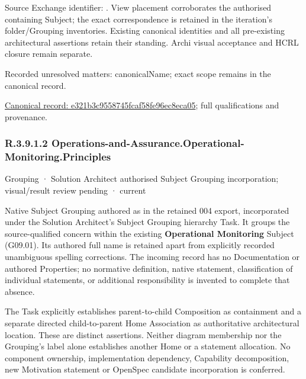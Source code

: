 Source Exchange identifier: \texttt{}. View placement corroborates
the authorised containing Subject; the exact correspondence is retained in the
iteration's folder/Grouping inventories. Existing canonical identities and all
pre-existing architectural assertions retain their standing. Archi visual
acceptance and HCRL closure remain separate.


{\small Recorded unresolved matters: canonicalName; exact scope remains in the canonical record.}\par
{\footnotesize \href{../../../../continuum/grouping/e321b3c9558745fcaf58fe96ec8eca05.md}{Canonical record: e321b3c9558745fcaf58fe96ec8eca05}; full qualifications and provenance.}\par
\subsubsection*{R.3.9.1.2 Operations-and-Assurance.Operational-Monitoring.Principles}
\label{navigation:R.3.9.1.2}

\label{element:73a9255ce3cd4be89c2f5f65868c5f79}
{\small Grouping · Solution Architect authorised Subject Grouping incorporation; visual/result review pending · current}\par

Native Subject Grouping authored as \texttt{} in the retained 004 export,
incorporated under the Solution Architect's Subject Grouping hierarchy Task.
It groups the source-qualified \texttt{} concern within
the existing \textbf{Operational Monitoring} Subject (G09.01). Its authored full name
is retained apart from explicitly recorded unambiguous spelling corrections.
The incoming record has no Documentation or authored Properties; no normative
definition, native statement, classification of individual statements, or
additional responsibility is invented to complete that absence.



The Task explicitly establishes parent-to-child Composition as containment and
a separate directed child-to-parent Home Association as authoritative architectural
location. These are distinct assertions. Neither diagram membership nor the
Grouping's label alone establishes another Home or a statement allocation.
No component ownership, implementation dependency, Capability decomposition,
new Motivation statement or OpenSpec candidate incorporation is conferred.



